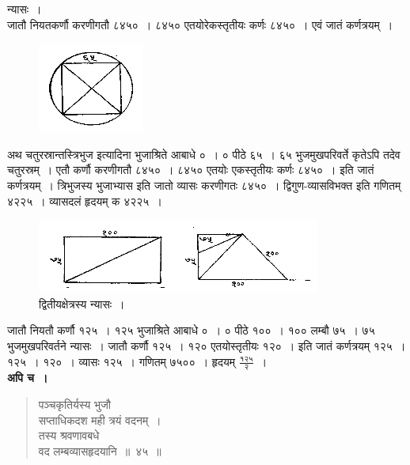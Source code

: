 \documentclass[11pt, openany]{book}
\begin{document}
 न्यासः~। \\

\vspace{-4mm}
 जातौ नियतकर्णौ करणीगतौ ८४५०~। ८४५० एतयोरेकस्तृतीयः
कर्णः ८४५०~। एवं जातं कर्णत्रयम्~।
\vspace{-2mm}

\begin{figure}[h!]
    \centering
    \includegraphics[scale=0.8]{graphics/capture55.png}
\end{figure}
\vspace{-2mm}

 अथ चतुरस्रान्तस्त्रिभुज इत्यादिना भुजाश्रिते आबाधे ०~। ० पीठे
६५~। ६५ भुजमुखपरिवर्ते कृतेऽपि तदेव चतुरस्रम्~। एतौ कर्णौ
करणीगतौ ८४५०~। ८४५० एतयोः एकस्तृतीयः कर्णः ८४५०~। इति
\newpage
\noindent जातं कर्णत्रयम्~। त्रिभुजस्य भुजाभ्यास इति जातो व्यासः करणीगतः ८४५०~। द्विगुण-व्यासविभक्त इति गणितम् ४२२५~। व्यासदलं हृदयम् क ४२२५~। 

\begin{figure}[h!]
    \centering
   \captionsetup{labelformat=empty}
    \caption{द्वितीयक्षेत्रस्य न्यासः~।}
\vspace{-2mm}
    
    \includegraphics[scale=0.8]{graphics/capture56.png}
\end{figure}
\vspace{-2mm}

 जातौ नियतौ कर्णौ १२५~। १२५ भुजाश्रिते आबाधे ०~। ० पीठे
१००~। १०० लम्बौ ७५~। ७५ भुजमुखपरिवर्तने न्यासः~। जातौ कर्णौ
१२५~। १२० एतयोस्तृतीयः १२०~। इति जातं कर्णत्रयम् १२५~। १२५~। 
१२०~। व्यासः १२५~। गणितम् ७५००~। हृदयम् $\frac{\mbox{१२५}}{\mbox{२}}$~। \\

\vspace{-2mm}
 \textbf{अपि च~।} 
\begin{quote}
    \bqt 
     पञ्चकृतिर्यस्य भुजौ \\
     सप्ताधिकदश मही त्रयं वदनम्~।\\
तस्य श्रवणावबधे \\
वद लम्बव्यासहृदयानि~॥~४५~॥
\end{quote}
\end{document}
